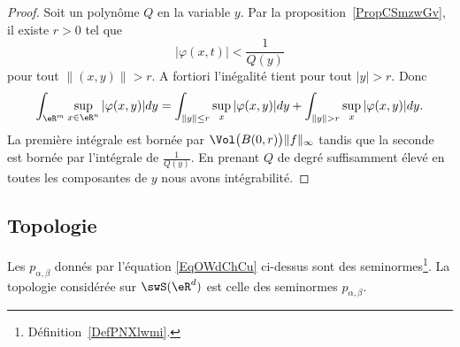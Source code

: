 \begin{proof}
    Soit un polynôme \( Q\) en la variable \( y\). Par la proposition~\ref{PropCSmzwGv}, il existe \( r>0\) tel que
    \begin{equation}
        | \varphi(x,t) |<\frac{1}{ Q(y) }
    \end{equation}
    pour tout \( \| (x,y) \|>r\). A fortiori l'inégalité tient pour tout \( | y |>r\). Donc
    \begin{equation}
        \int_{\eR^m}\sup_{x\in \eR^n}| \varphi(x,y) |dy=\int_{\| y \|\leq r}\sup_{x}| \varphi(x,y) |dy+\int_{ \| y \|>r  }\sup_{x}| \varphi(x,y) |dy.
    \end{equation}
    La première intégrale est bornée par \( \Vol\big( B(0,r) \big)\| f \|_{\infty}\) tandis que la seconde est bornée par l'intégrale de \( \frac{1}{ Q(y) }\). En prenant \( Q\) de degré suffisamment élevé en toutes les composantes de \( y\) nous avons intégrabilité.
\end{proof}

\subsection{Topologie}

\begin{lemmaDef}        \label{LEMDEFooZEFVooMMmiBr}
    Les \( p_{\alpha,\beta}\) donnés par l'équation \eqref{EqOWdChCu} ci-dessus sont des seminormes\footnote{Définition~\ref{DefPNXlwmi}.}. La topologie considérée sur \( \swS(\eR^d)\) est celle des seminormes \( p_{\alpha,\beta}\).
\end{lemmaDef}


